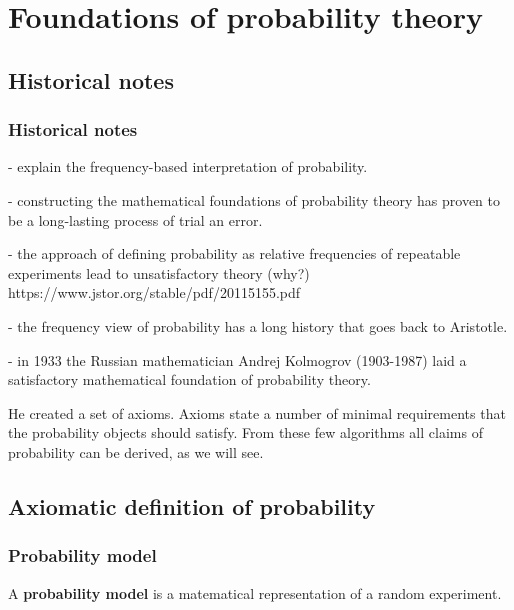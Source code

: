 \section{Foundations of probability theory}

\subsection{Historical notes}

\begin{frame}
\frametitle{Historical notes}

- explain the frequency-based interpretation of probability.

- constructing the mathematical foundations of probability theory has proven to be a long-lasting process of trial an error.  

- the approach of defining probability as relative frequencies of repeatable experiments lead to unsatisfactory theory (why?)
https://www.jstor.org/stable/pdf/20115155.pdf

- the frequency view of probability has a long history that goes back to Aristotle.

- in 1933 the Russian mathematician Andrej Kolmogrov (1903-1987) laid a satisfactory mathematical foundation of probability theory.

He created a set of axioms. Axioms state a number of minimal requirements that the probability objects should satisfy. From these few algorithms all claims of probability can be derived, as we will see.

\end{frame}

\subsection{Axiomatic definition of probability}

\begin{frame}
\frametitle{Probability model}

    \begin{probDef}
        A \textbf{probability model} is a matematical representation of a
        random experiment. 
        \label{def:probabilityModel}
    \end{probDef}

\end{frame}

